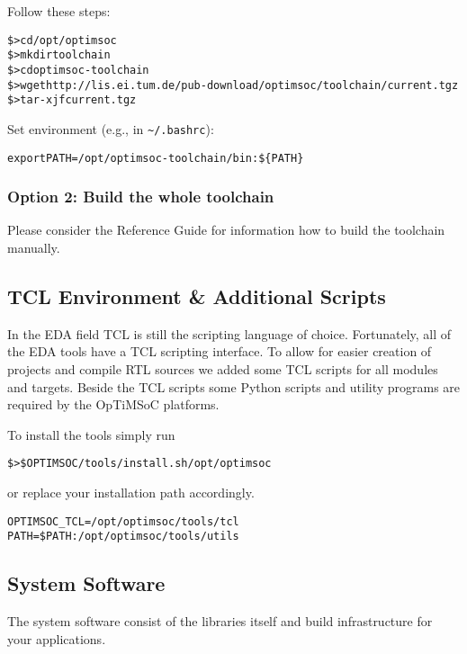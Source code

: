 Follow these steps:

\begin{alltt}
\$> cd /opt/optimsoc
\$> mkdir toolchain
\$> cd optimsoc-toolchain
\$> wget http://lis.ei.tum.de/pub-download/optimsoc/toolchain/current.tgz
\$> tar -xjf current.tgz
\end{alltt}

Set environment (e.g., in \verb|~/.bashrc|):

\begin{alltt}
export PATH=/opt/optimsoc-toolchain/bin:\$\{PATH\}
\end{alltt}

\subsubsection{Option 2: Build the whole toolchain}

Please consider the Reference Guide for information how to build the
toolchain manually.

\subsection{TCL Environment \& Additional Scripts}

In the EDA field TCL is still the scripting language of choice.
Fortunately, all of the EDA tools have a TCL scripting interface. To
allow for easier creation of projects and compile RTL sources we added
some TCL scripts for all modules and targets. Beside the TCL scripts
some Python scripts and utility programs are required by the OpTiMSoC
platforms.

To install the tools simply run

\begin{alltt}
\$> \$OPTIMSOC/tools/install.sh /opt/optimsoc
\end{alltt}

or replace your installation path accordingly.

\begin{alltt}
OPTIMSOC_TCL=/opt/optimsoc/tools/tcl
PATH=\$PATH:/opt/optimsoc/tools/utils
\end{alltt}

\subsection{System Software}

The system software consist of the libraries itself and build
infrastructure for your applications.


